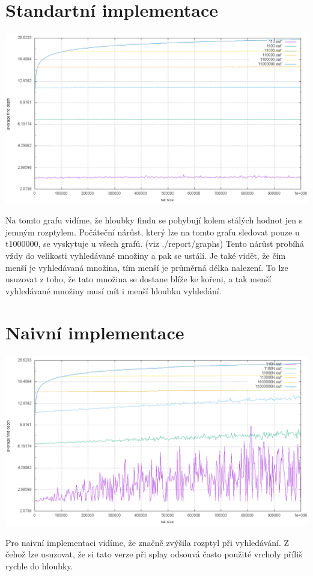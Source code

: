 \documentclass[12pt,a4paper]{report}
\begin{document}
\section{Standartní implementace}
\includegraphics[width=\textwidth]{./graphs/1.png}

Na tomto grafu vidíme, že hloubky findu
se pohybují kolem stálých hodnot jen s jemným rozptylem.
Počáteční nárůst, který lze na tomto grafu sledovat pouze u t1000000,
se vyskytuje u všech grafů. (viz ./report/graphs) Tento nárůst probíhá
vždy do velikosti vyhledávané množiny a pak se ustálí.
Je také vidět, že čím menší je vyhledávaná množina, tím menší je
průměrná délka nalezení. To lze usuzovat z toho, že tato množina se
dostane blíže ke kořeni, a tak menší vyhledávané množiny musí mít
i menší hloubku vyhledání. 

\section{Naivní implementace}
\includegraphics[width=\textwidth]{./graphs/2.png}

Pro naivní implementaci vidíme, že značně zvýšila rozptyl při 
vyhledávání. Z čehož lze usuzovat, že si tato verze při splay odsouvá
často použité vrcholy příliš rychle do hloubky. 
  
\end{document}
